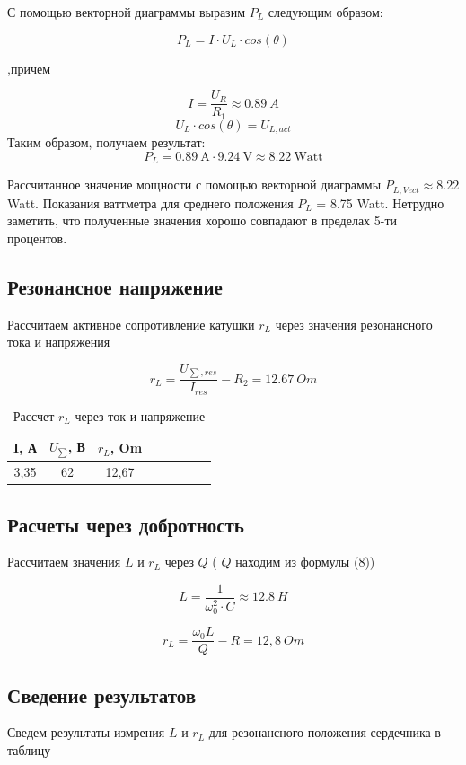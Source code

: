\documentclass[a4paper, 14pt]{extarticle}%
\begin{document}
С помощью векторной диаграммы выразим $P_L$ следующим образом:

$$
P_L = I\cdot U_L\cdot cos(\theta)
$$

,причем

$$
I = \frac{U_R}{R_1} \approx 0.89 \: A
$$
$$
U_L\cdot cos(\theta) = U_{L, act}
$$
Таким образом, получаем результат:
$$
P_{L} = 0.89 \: \text{A} \cdot 9.24 \: \text{V} \approx 8.22 \: \text{Watt}
$$

Рассчитанное значение мощности с помощью векторной диаграммы $P_{L,Vect} \approx 8.22$  Watt.
\newline
Показания ваттметра для среднего положения $P_{L}$ = 8.75 Watt. Нетрудно заметить, что полученные значения хорошо совпадают в пределах 5-ти процентов.

\subsection{Резонансное напряжение}
Рассчитаем активное сопротивление катушки $ r_{L}$ через значения резонансного тока и напряжения

$$
r_{L} = \frac{U_{\sum,res}}{I_{res}} - R_2 = 12.67 \: Om
$$


\begin{table}[h!]
	\centering
	\caption{Рассчет $ r_{L}$ через ток и напряжение }
	\begin{tabular}{|c|c|c|c|c|c|c|c|}
		\hline
		 I, А &  $U_{\sum}$, В & $ r_{L}$, Om \\
		\hline
		  3,35 & 62 &  12,67\\
		 \hline
	\end{tabular}%
\label{resT}%
\end{table}%


\subsection{Расчеты через добротность}
Рассчитаем значения $ L $ и $ r_{L} $ через $ Q $ ( $ Q $ находим из формулы (8))

$$
L = \frac{1}{\omega_{0}^2\cdot C} \approx  12.8 \: H
$$

$$
r_{L} = \frac{{\omega_{0}}{L}}{Q} - R = 12,8 \: Om
$$


\subsection{Сведение результатов}
Сведем результаты измрения $ L $ и $ r_{L} $ для резонансного положения сердечника в таблицу 
\end{document}
